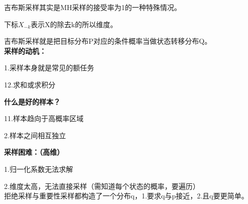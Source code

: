 \documentclass[UTF8]{ctexart} %
\begin{document}
				吉布斯采样其实是MH采样的接受率为1的一种特殊情况。
				\begin{figure}[H]
				\end{figure}
				下标$X_{-k}$表示X的除去k的所以维度。
				
				吉布斯采样就是把目标分布P对应的条件概率当做状态转移分布Q。\\
				
				\textbf{采样的动机：}
				
				\quad1.采样本身就是常见的额任务
				
				\quad12.求和或求积分
				
				\textbf{什么是好的样本？}
				
				\quad11.样本趋向于高概率区域
				
				 2.样本之间相互独立
				
				\textbf{采样困难：（高维）}
				
				\quad1.归一化系数无法求解
				
				\quad2.维度太高，无法直接采样（需知道每个状态的概率，要遍历）\\
				
				拒绝采样与重要性采样都构造了一个分布q，1.要求q与p接近，2.且q要更简单。
			
		
			
			
			
			
\end{document}
